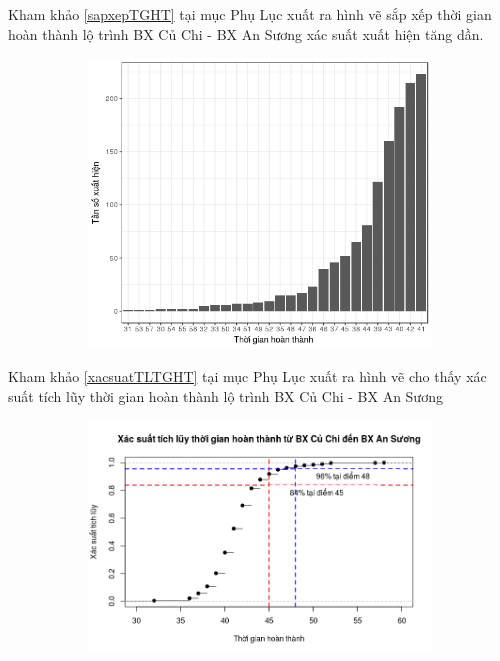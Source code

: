 \documentclass[a4paper, 13pt]{report}
\begin{document}
Kham khảo \ref{sapxepTGHT} tại mục Phụ Lục xuất ra hình vẽ sắp xếp thời gian hoàn thành lộ trình BX Củ Chi - BX An Sương xác suất xuất hiện tăng dần.\\
\FloatBarrier
\begin{figure}[h!]
        \begin{subfigure}[b]{0.5\textwidth}
                \label{tab:example}
                \includegraphics[width=\linewidth]{finishTime_CC_AS_Order}
        \end{subfigure}%
\end{figure}
\FloatBarrier
Kham khảo \ref{xacsuatTLTGHT} tại mục Phụ Lục xuất ra hình vẽ cho thấy xác suất tích lũy thời gian hoàn thành lộ trình BX Củ Chi - BX An Sương \\
\FloatBarrier
\begin{figure}[h!]
        \begin{subfigure}[b]{0.7\textwidth}
        		\label{tab:example2}
                \includegraphics[width=\linewidth]{finishTime_CC_AS_ACC_Line}
        \end{subfigure}%
\end{figure}
\FloatBarrier
\end{document}
